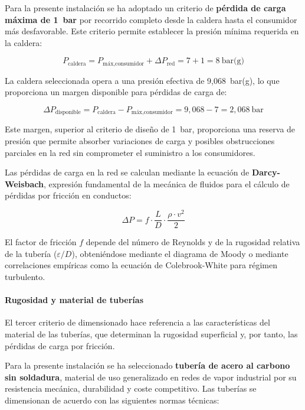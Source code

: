 \documentclass[12pt]{article}
\begin{document}
Para la presente instalación se ha adoptado un criterio de \textbf{pérdida de carga máxima de 1~bar} por recorrido completo desde la caldera hasta el consumidor más desfavorable. Este criterio permite establecer la presión mínima requerida en la caldera:

\begin{equation}
	P_{\text{caldera}} = P_{\text{máx,consumidor}} + \Delta P_{\text{red}} = 7 + 1 = 8 \ \text{bar(g)}
	\label{eq:presion-minima-caldera}
\end{equation}

La caldera seleccionada opera a una presión efectiva de 9,068~bar(g), lo que proporciona un margen disponible para pérdidas de carga de:

\begin{equation}
	\Delta P_{\text{disponible}} = P_{\text{caldera}} - P_{\text{máx,consumidor}} = 9{,}068 - 7 = 2{,}068 \ \text{bar}
	\label{eq:margen-presion-disponible}
\end{equation}

Este margen, superior al criterio de diseño de 1~bar, proporciona una reserva de presión que permite absorber variaciones de carga y posibles obstrucciones parciales en la red sin comprometer el suministro a los consumidores.

Las pérdidas de carga en la red se calculan mediante la ecuación de \textbf{Darcy-Weisbach}, expresión fundamental de la mecánica de fluidos para el cálculo de pérdidas por fricción en conductos:

\begin{equation}
	\Delta P = f \cdot \frac{L}{D} \cdot \frac{\rho \cdot v^2}{2}
	\label{eq:darcy-weisbach}
\end{equation}


El factor de fricción $f$ depende del número de Reynolds y de la rugosidad relativa de la tubería ($\varepsilon/D$), obteniéndose mediante el diagrama de Moody o mediante correlaciones empíricas como la ecuación de Colebrook-White para régimen turbulento.

\paragraph{Rugosidad y material de tuberías}

El tercer criterio de dimensionado hace referencia a las características del material de las tuberías, que determinan la rugosidad superficial y, por tanto, las pérdidas de carga por fricción.

Para la presente instalación se ha seleccionado \textbf{tubería de acero al carbono sin soldadura}, material de uso generalizado en redes de vapor industrial por su resistencia mecánica, durabilidad y coste competitivo. Las tuberías se dimensionan de acuerdo con las siguientes normas técnicas:
\end{document}
